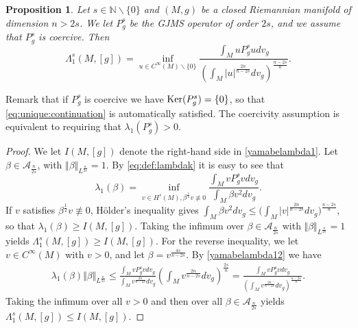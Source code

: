 \documentclass[10pt]{amsart}
\numberwithin{equation}{section}
\def\Om{{\Omega}}
\def\ker{{\mathop{\rm Ker}}}
\theoremstyle{plain}
\newtheorem{prop}[theo]{Proposition}%
\theoremstyle{remark}
\begin{document}
\begin{prop} \label{prop:Lambda1:Yamabe}
Let $s \in \mathbb{N} \backslash \{0\}$ and $(M,g)$ be a closed Riemannian manifold of dimension $n > 2s$. We let $P_g^s$ be the GJMS operator of order $2s$, and we assume that $P_g^s$ is coercive. Then  
\begin{equation} \label{yamabelambda1}
\Lambda_1^s(M,[g]) = \inf_{u \in C^\infty(M) \backslash \{0\}} \frac{\int_{M} u P_{g}^s u dv_{g}}{\left(\int_{M} |u|^{\frac{2n}{n-2s}} dv_{g} \right)^{\frac{n-2s}{n}}}.
\end{equation}
\end{prop}
Remark that if $P_g^s$ is coercive we have $\ker(P_g^s) = \{0\}$, so that \eqref{eq:unique:continuation} is automatically satisfied. The coercivity assumption is equivalent to requiring that  $\lambda_1(P_g^s) >0$. 

\begin{proof}
We let $I(M,[g])$ denote the right-hand side in \eqref{yamabelambda1}. Let $\beta \in \mathcal{A}_{\frac{n}{2s}}$, with $\Vert \beta \Vert_{L^{\frac{n}{2s}}} = 1$. By \eqref{eq:def:lambdak} it is easy to see that 
\begin{equation} \label{yamabelambda12}
 \lambda_1(\beta) = \inf_{ v \in H^s(M), \beta^{\frac12}v \not \equiv 0} \frac{\int_M v P_g^sv dv_g}{\int_M \beta v^2 dv_g}.  
 \end{equation}
If $v$ satisfies $ \beta^{\frac12}v \not \equiv 0$, H\"older's inequality gives $ \int_{M} \beta v^2dv_g \le \Big(\int_{M} |v|^{\frac{2n}{n-2s}}dv_g \Big)^{\frac{n-2s}{n}}$, so that $ \lambda_1(\beta) \ge I(M,[g])$. Taking the infimum over $\beta \in \mathcal{A}_{\frac{n}{2s}}$ with $\Vert \beta \Vert_{L^{\frac{n}{2s}}} = 1$ yields $\Lambda_1^s(M,[g]) \ge I(M,[g])$. For the reverse inequality, we let $v \in C^\infty(M)$ with $v >0$, and let $\beta = v^{\frac{4s}{n-2s}}$. By \eqref{yamabelambda12} we have 
$$\begin{aligned}
\lambda_1(\beta) \Vert \beta \Vert_{L^{\frac{n}{2s}}}  \le \frac{\int_M v P_g^sv dv_g}{\int_M v^{\frac{2n}{n-2s}} dv_g} \left( \int_M v^{\frac{2n}{n-2s}} dv_g \right)^{\frac{2s}{n}}    =  \frac{\int_{M} v P_{g}^s v dv_{g}}{\left(\int_{M} v^{\frac{2n}{n-2s}} dv_{g} \right)^{\frac{n-2s}{n}}}.
\end{aligned} $$ 
Taking the infimum over all $v >0$ and then over all $\beta \in \mathcal{A}_{\frac{n}{2s}}$ yields $\Lambda_1^s(M,[g]) \le I(M,[g])$.
\end{proof}
\end{document}
